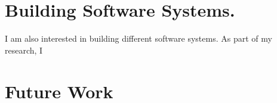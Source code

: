 \documentclass[a4paper, 11pt]{article}
\begin{document}
\begin{small}
\section*{\large Building Software Systems.}
I am also interested in building different software systems. As part of my research, I 


\section*{Future Work}


\begin{comment}

Furthermore, once a feature is introduced in one of the BSDs, it suffers significant delay, on
average three releases, to propagate to other BSDs.


In summary, this study shows that the upkeep effort of maintaining forked variant products is
significant and calls for new techniques to automate porting. The findings of this study was
published in ACM SIGSOFT International Symposium on the Foundations of Software Engineering
(FSE 2012)~\cite{Ray2012}.



\end{comment}
\end{small}
\end{document}
